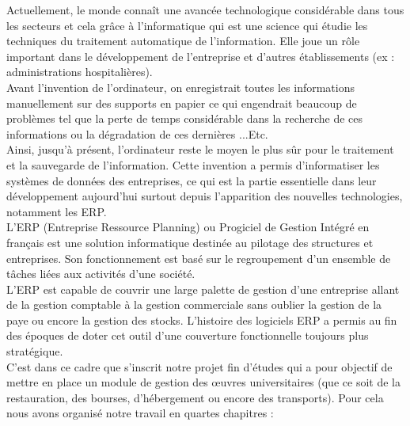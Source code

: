 Actuellement, le monde connaît une avancée technologique considérable dans tous les secteurs et cela grâce à l'informatique qui est une science qui étudie les techniques du traitement automatique de l'information. Elle joue un rôle important dans le développement de l'entreprise et d'autres établissements (ex : administrations hospitalières).\\

Avant l'invention de l'ordinateur, on enregistrait toutes les informations manuellement sur des supports en papier ce qui engendrait beaucoup de problèmes tel que la perte de temps considérable dans la recherche de ces informations ou la dégradation de ces dernières ...Etc.\\

Ainsi, jusqu'à présent, l'ordinateur reste le moyen le plus sûr pour le traitement et la sauvegarde de l'information. Cette invention a permis d'informatiser les systèmes de données des entreprises, ce qui est la partie essentielle dans leur développement aujourd'hui surtout depuis l'apparition des nouvelles technologies, notamment les ERP.\\

L'ERP (Entreprise Ressource Planning) ou Progiciel de Gestion Intégré en français est une solution informatique destinée au pilotage des structures et entreprises. Son fonctionnement est basé sur le regroupement d'un ensemble de tâches liées aux activités d'une société.\\

L'ERP est capable de couvrir une large palette de gestion d'une entreprise allant de la gestion comptable à la gestion commerciale sans oublier la gestion de la paye ou encore la gestion des stocks. L'histoire des logiciels ERP a permis au fin des époques de doter cet outil d'une couverture fonctionnelle toujours plus stratégique.\\

C'est dans ce cadre que s'inscrit notre projet fin d'études qui a pour objectif de mettre en place un module de gestion des œuvres universitaires (que ce soit de la restauration, des bourses, d'hébergement ou encore des transports). Pour cela nous avons organisé notre travail en quartes chapitres :\\

